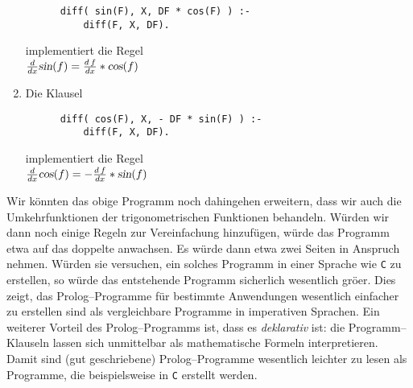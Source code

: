\begin{enumerate}
      \begin{verbatim}
      diff( sin(F), X, DF * cos(F) ) :-
          diff(F, X, DF).
      \end{verbatim}
      \vspace*{-0.7cm}

      implementiert die Regel \\[0.1cm]
      \hspace*{1.3cm} $\frac{d}{dx}\textsl{sin}(f) = \frac{d\,f}{dx}* \textsl{cos}(f)$
\item Die Klausel
      \vspace*{-0.3cm}

      \begin{verbatim}
      diff( cos(F), X, - DF * sin(F) ) :-
          diff(F, X, DF).
      \end{verbatim}
      \vspace*{-0.7cm}

      implementiert die Regel \\[0.1cm]
      \hspace*{1.3cm} $\frac{d}{dx}\textsl{cos}(f) = - \frac{d\,f}{dx}* \textsl{sin}(f)$
\end{enumerate}
Wir k\"{o}nnten das obige Programm noch dahingehen erweitern, dass wir auch die Umkehrfunktionen der trigonometrischen Funktionen
behandeln.  W\"{u}rden wir dann noch einige Regeln zur Vereinfachung hinzuf\"{u}gen, w\"{u}rde das Programm etwa auf das doppelte anwachsen.
Es w\"{u}rde dann etwa zwei Seiten in Anspruch nehmen.  W\"{u}rden sie versuchen, ein solches Programm in einer Sprache wie \texttt{C} zu erstellen,
so w\"{u}rde das entstehende Programm sicherlich wesentlich gr\"{o}\3er.
Dies zeigt, das Prolog--Programme f\"{u}r bestimmte Anwendungen wesentlich einfacher zu erstellen sind als vergleichbare
Programme in  imperativen Sprachen.  Ein weiterer Vorteil des Prolog--Programms ist, dass es \emph{deklarativ} ist:
die Programm--Klauseln lassen sich unmittelbar als mathematische Formeln interpretieren.  Damit sind (gut geschriebene)
Prolog--Programme wesentlich leichter zu lesen als Programme, die beispielsweise in \texttt{C} erstellt werden.





